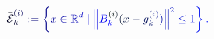 \documentclass[12pt]{article}
\begin{document}
\makeatletter
\renewcommand*{\@textcolor}[3]{%
  \protect\leavevmode
  \begingroup
    \color#1{#2}#3%
  \endgroup
}
\makeatother
\begin{displaymath}
{\mathcolor[RGB]{0,0,15}{\bar { \mathcal { \mathcolor[RGB]{0,0,30}{E} } } }} _ { \mathcolor[RGB]{0,0,45}{k} } ^ { \mathcolor[RGB]{0,0,60}{(} \mathcolor[RGB]{0,0,75}{i} \mathcolor[RGB]{0,0,90}{)} } \mathcolor[RGB]{0,0,105}{:} \mathcolor[RGB]{0,0,120}{=} \mathcolor[RGB]{0,0,135}{\left\{} \mathcolor[RGB]{0,0,150}{x} \mathcolor[RGB]{0,0,165}{\in} \mathbb { \mathcolor[RGB]{0,0,180}{R} } ^ { \mathcolor[RGB]{0,0,195}{d} } \mathcolor[RGB]{0,0,210}{\mid} \mathcolor[RGB]{0,0,225}{\left\|} \mathcolor[RGB]{0,0,240}{B} _ { \mathcolor[RGB]{0,0,255}{k} } ^ { \mathcolor[RGB]{0,15,0}{(} \mathcolor[RGB]{0,15,15}{i} \mathcolor[RGB]{0,15,30}{)} } \mathcolor[RGB]{0,15,45}{(} \mathcolor[RGB]{0,15,60}{x} \mathcolor[RGB]{0,15,75}{-} \mathcolor[RGB]{0,15,90}{g} _ { \mathcolor[RGB]{0,15,105}{k} } ^ { \mathcolor[RGB]{0,15,120}{(} \mathcolor[RGB]{0,15,135}{i} \mathcolor[RGB]{0,15,150}{)} } \mathcolor[RGB]{0,15,165}{)} \mathcolor[RGB]{0,15,180}{\right\|} ^ { \mathcolor[RGB]{0,15,195}{2} } \mathcolor[RGB]{0,15,210}{\leq} \mathcolor[RGB]{0,15,225}{1} \mathcolor[RGB]{0,15,240}{\right\}} \mathcolor[RGB]{0,15,255}{.}
\end{displaymath}
\end{document}
